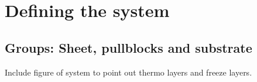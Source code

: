 


\section{Defining the system}

\subsection{Groups: Sheet, pullblocks and substrate}
Include figure of system to point out thermo layers and freeze layers.



